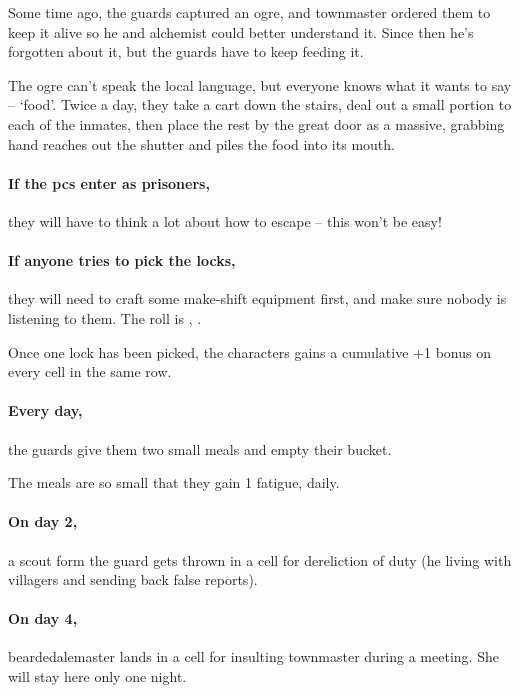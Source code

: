\prisonMap

\label{stationDungeon}

\begin{exampletext}
  Some time ago, the guards captured an ogre, and \gls{townmaster} ordered them to keep it alive so he and \gls{alchemist} could better understand it.
  Since then he's forgotten about it, but the guards have to keep feeding it.

  The ogre can't speak the local language, but everyone knows what it wants to say -- `food'.
  Twice a day, they take a cart down the stairs, deal out a small portion to each of the inmates, then place the rest by the great door as a massive, grabbing hand reaches out the shutter and piles the food into its mouth.
\end{exampletext}

\paragraph{If the \glspl{pc} enter as prisoners,}
they will have to think a lot about how to escape -- this won't be easy!

\paragraph{If anyone tries to pick the locks,}
they will need to craft some make-shift equipment first, and make sure nobody is listening to them.
The roll is , \tn[12].

Once one lock has been picked, the characters gains a cumulative +1 bonus on every cell in the same row.

\paragraph{Every day,}
the guards give them two small meals and empty their bucket.

The meals are so small that they gain 1 \gls{fatigue}, daily.

\paragraph{On day 2,}
a scout form the \gls{guard} gets thrown in a cell for dereliction of duty (he living with villagers and sending back false reports).

\paragraph{On day 4,}
\gls{beardedalemaster} lands in a cell for insulting \gls{townmaster} during a meeting.
She will stay here only one night.

